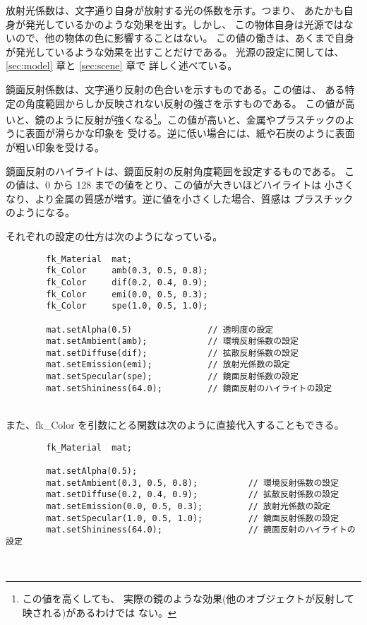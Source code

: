 放射光係数は、文字通り自身が放射する光の係数を示す。つまり、
あたかも自身が発光しているかのような効果を出す。しかし、
この物体自身は光源ではないので、他の物体の色に影響することはない。
この値の働きは、あくまで自身が発光しているような効果を出すことだけである。
光源の設定に関しては、\ref{sec:model} 章と \ref{sec:scene} 章で
詳しく述べている。

鏡面反射係数は、文字通り反射の色合いを示すものである。この値は、
ある特定の角度範囲からしか反映されない反射の強さを示すものである。
この値が高いと、鏡のように反射が強くなる\footnote{この値を高くしても、
実際の鏡のような効果(他のオブジェクトが反射して映される)があるわけでは
ない。}。この値が高いと、金属やプラスチックのように表面が滑らかな印象を
受ける。逆に低い場合には、紙や石炭のように表面が粗い印象を受ける。

鏡面反射のハイライトは、鏡面反射の反射角度範囲を設定するものである。
この値は、0 から 128 までの値をとり、この値が大きいほどハイライトは
小さくなり、より金属の質感が増す。逆に値を小さくした場合、質感は
プラスチックのようになる。

それぞれの設定の仕方は次のようになっている。
\\
\begin{breakbox}
\begin{verbatim}
        fk_Material  mat;
        fk_Color     amb(0.3, 0.5, 0.8);
        fk_Color     dif(0.2, 0.4, 0.9);
        fk_Color     emi(0.0, 0.5, 0.3);
        fk_Color     spe(1.0, 0.5, 1.0);

        mat.setAlpha(0.5)               // 透明度の設定
        mat.setAmbient(amb);            // 環境反射係数の設定
        mat.setDiffuse(dif);            // 拡散反射係数の設定
        mat.setEmission(emi);           // 放射光係数の設定
        mat.setSpecular(spe);           // 鏡面反射係数の設定
        mat.setShininess(64.0);         // 鏡面反射のハイライトの設定
\end{verbatim}
\end{breakbox}
~ \\
また、fk\_Color を引数にとる関数は次のように直接代入することもできる。
\\
\begin{breakbox}
\begin{verbatim}
        fk_Material  mat;

        mat.setAlpha(0.5);
        mat.setAmbient(0.3, 0.5, 0.8);          // 環境反射係数の設定
        mat.setDiffuse(0.2, 0.4, 0.9);          // 拡散反射係数の設定
        mat.setEmission(0.0, 0.5, 0.3);         // 放射光係数の設定
        mat.setSpecular(1.0, 0.5, 1.0);         // 鏡面反射係数の設定
        mat.setShininess(64.0);                 // 鏡面反射のハイライトの設定
\end{verbatim}
\end{breakbox}
~

